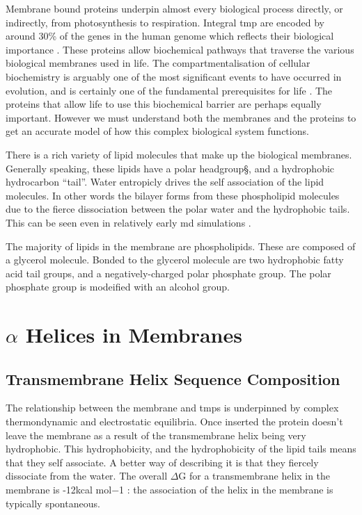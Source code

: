 Membrane bound proteins underpin almost every biological process directly, or indirectly, from photosynthesis to respiration. Integral \gls{tmp} are encoded by around 30\% of the genes in the human genome which reflects their biological importance \cite{Almen2009}. These proteins allow biochemical pathways that traverse the various biological membranes used in life. The compartmentalisation of cellular biochemistry is arguably one of the most significant events to have occurred in evolution, and is certainly one of the fundamental prerequisites for life \cite{Koshland2002}. The proteins that allow life to use this biochemical barrier are perhaps equally important. However we must understand both the membranes and the proteins to get an accurate model of how this complex biological system functions.

There is a rich variety of lipid molecules that make up the biological membranes. Generally speaking, these lipids have a polar headgroup§, and a hydrophobic hydrocarbon ``tail''. Water entropicly drives the self association of the lipid molecules. In other words the bilayer forms from these phospholipid molecules due to the fierce dissociation between the polar water and the hydrophobic tails. This can be seen even in relatively early \gls{md} simulations \cite{Goetz1998}.

The majority of lipids in the membrane are phospholipids. These are composed of a glycerol molecule. Bonded to the glycerol molecule are two hydrophobic fatty acid tail groups, and a negatively-charged polar phosphate group. The polar phosphate group is modeified with an alcohol group.


\section{$\alpha$ Helices in Membranes }
\subsection{Transmembrane Helix Sequence Composition}



The relationship between the membrane and \gls{tmp}s is underpinned by complex thermondynamic and electrostatic equilibria. Once inserted the protein doesn't leave the membrane as a result of the transmembrane helix being very hydrophobic. This hydrophobicity, and the hydrophobicity of the lipid tails means that they self associate. A better way of describing it is that they fiercely dissociate from the water. The overall $\Delta$G for a transmembrane helix in the membrane is -12kcal mol−1 \cite{Cymer2014}: the association of the helix in the membrane is typically spontaneous.

